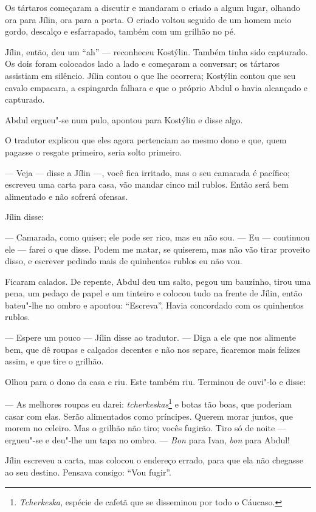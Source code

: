 Os tártaros começaram a discutir e mandaram o criado a algum lugar,
olhando ora para Jílin, ora para a porta. O criado voltou seguido de um
homem meio gordo, descalço e esfarrapado, também com um grilhão no pé.

Jílin, então, deu um ``ah'' --- reconheceu Kostýlin. Também tinha sido
capturado. Os dois foram colocados lado a lado e começaram a conversar;
os tártaros assistiam em silêncio. Jílin contou o que lhe ocorrera;
Kostýlin contou que seu cavalo empacara, a espingarda falhara e que o
próprio Abdul o havia alcançado e capturado.

Abdul ergueu"-se num pulo, apontou para Kostýlin e disse algo.

O tradutor explicou que eles agora pertenciam ao mesmo dono e que, quem
pagasse o resgate primeiro, seria solto primeiro.

--- Veja --- disse a Jílin ---, você fica irritado, mas o seu camarada é
pacífico; escreveu uma carta para casa, vão mandar cinco mil rublos.
Então será bem alimentado e não sofrerá ofensas.

Jílin disse:

--- Camarada, como quiser; ele pode ser rico, mas eu não sou. --- Eu ---
continuou ele --- farei o que disse. Podem me matar, se quiserem, mas
não vão tirar proveito disso, e escrever pedindo mais de quinhentos
rublos eu não vou.

Ficaram calados. De repente, Abdul deu um salto, pegou um bauzinho,
tirou uma pena, um pedaço de papel e um tinteiro e colocou tudo na
frente de Jílin, então bateu"-lhe no ombro e apontou: ``Escreva''. Havia
concordado com os quinhentos rublos.

--- Espere um pouco --- Jílin disse ao tradutor. --- Diga a ele que nos
alimente bem, que dê roupas e calçados decentes e não nos separe,
ficaremos mais felizes assim, e que tire o grilhão.

Olhou para o dono da casa e riu. Este também riu. Terminou de ouvi"-lo e
disse:

--- As melhores roupas eu darei: \emph{tcherkeskas}\footnote{\emph{Tcherkeska,}
  espécie de cafetã que se disseminou por todo o Cáucaso.} e botas tão
boas, que poderiam casar com elas. Serão alimentados como príncipes.
Querem morar juntos, que morem no celeiro. Mas o grilhão não tiro; vocês
fugirão. Tiro só de noite --- ergueu"-se e deu"-lhe um tapa no ombro. ---
\emph{Bon} para Ivan, \emph{bon} para Abdul!

Jílin escreveu a carta, mas colocou o endereço errado, para que ela não
chegasse ao seu destino. Pensava consigo: ``Vou fugir''.

